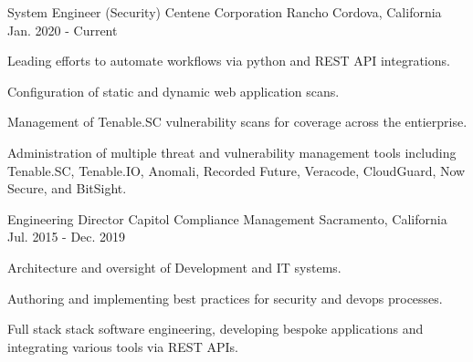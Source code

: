

\begin{cventries}

  \cventry
    {System Engineer (Security)} %
    {Centene Corporation} %
    {Rancho Cordova, California} %
    {Jan. 2020 - Current} %
    {
      \begin{cvitems} %
        \item {Leading efforts to automate workflows via python and REST API integrations.}
        \item {Configuration of static and dynamic web application scans.}
	\item {Management of Tenable.SC vulnerability scans for coverage across the entierprise.}
        \item {Administration of multiple threat and vulnerability management tools including Tenable.SC, Tenable.IO, Anomali, Recorded Future, Veracode, CloudGuard, Now Secure, and BitSight.}
      \end{cvitems}
    }



  \cventry
    {Engineering Director} %
    {Capitol Compliance Management} %
    {Sacramento, California} %
    {Jul. 2015 - Dec. 2019} %
    {
      \begin{cvitems} %
        \item {Architecture and oversight of Development and IT systems.}
        \item {Authoring and implementing best practices for security and devops processes.}
        \item {Full stack stack software engineering, developing bespoke applications and integrating various tools via REST APIs.}
      \end{cvitems}
    }



\end{cventries}

